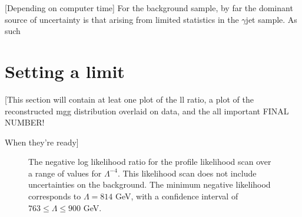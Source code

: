 [Depending on computer time]
For the background sample, by far the dominant source of uncertainty is that arising from limited statistics in the $\gamma$jet sample. As such

\section{Setting a limit}
[This section will contain at leat one plot of the ll ratio, a plot of the reconstructed mgg distribution overlaid on data, and the all important FINAL NUMBER!

When they're ready]
\begin{figure}[htp]
\begin{minipage}[b]{.69\textwidth}
\begin{infilsf} \tiny

\end{infilsf}
\end{minipage}
\begin{minipage}[b]{.3\textwidth}
\caption{The negative log likelihood ratio for the profile likelihood scan over a range of values for $\Lambda^{-4}$. This likelihood scan does not include uncertainties on the background. The minimum negative likelihood corresponds to $\Lambda=814$ GeV, with a confidence interval of $763 \le \Lambda \le 900$ GeV.}\label{bckfit}
\end{minipage}
\end{figure}
